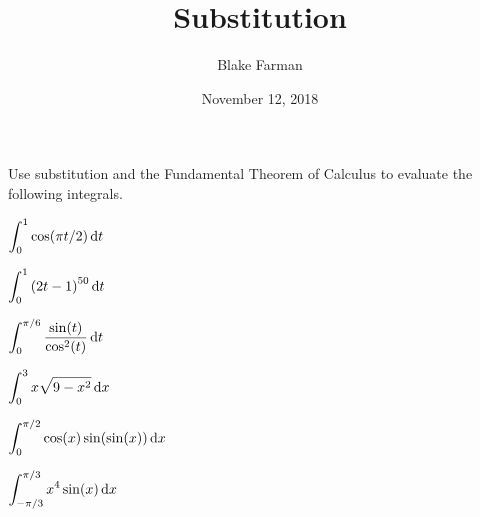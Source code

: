 \documentclass[10pt]{amsart}
\title{Substitution}
\date{November 12, 2018}
\author{Blake Farman}
\begin{document}
\maketitle

\makenameslot

\noindent
Use substitution and the Fundamental Theorem of Calculus to evaluate the following integrals.
\begin{multicols}{2}
  \begin{thm}
    \(\displaystyle{\int_0^1\cos(\pi t/2)\dif t}\)
  \end{thm}

  \begin{thm}
    \(\displaystyle{\int_0^1 \left(2t - 1\right)^{50} \dif t}\)
  \end{thm}
\end{multicols}

\vspace{2in}

\begin{multicols}{2}
  \begin{thm}
    \(\displaystyle{\int_0^{\pi/6} \frac{\sin(t)}{\cos^2(t)}\dif t}\)
  \end{thm}

  \begin{thm}
    \(\displaystyle{\int_0^3 x\sqrt{9 - x^2}\dif x}\)
  \end{thm}
\end{multicols}

\vspace{2in}

\newpage

\begin{multicols}{2}
  \begin{thm}
    \(\displaystyle{\int_0^{\pi/2} \cos(x) \sin(\sin(x)) \dif x}\)
  \end{thm}

  \begin{thm}
    \(\displaystyle{\int_{-\pi/3}^{\pi/3} x^4\sin(x) \dif x}\)
  \end{thm}
\end{multicols}
\end{document}
